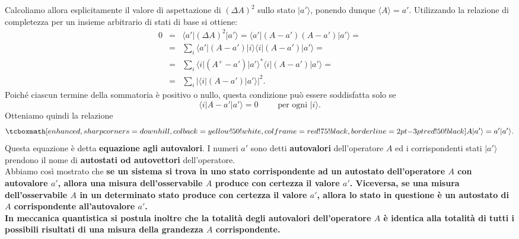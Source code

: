 Calcoliamo allora esplicitamente il valore di aspettazione di $(\Delta A )^2$ sullo stato $\vert a' \rangle$, ponendo dunque $\langle A \rangle = a'$. Utilizzando la relazione di completezza per un insieme arbitrario di stati di base si ottiene:
	\begin{eqnarray}
		0 & = & \langle a' \vert (\Delta A )^2 \vert a'\rangle = \langle a' \vert (A-a' )(A-a') \vert a'\rangle= \nonumber \\
		& = & \sum _i \langle a' \vert (A-a' ) \vert i \rangle \langle i \vert (A-a' ) \vert a' \rangle = \nonumber \\
		& = & \sum _i \langle i \vert (A^{+}-a' ) \vert a' \rangle ^* \langle i \vert (A-a' ) \vert a' \rangle = \nonumber \\
		& = & \sum _i \vert \langle i \vert (A-a' ) \vert a' \rangle \vert ^2.
	\end{eqnarray}
Poiché ciascun termine della sommatoria è positivo o nullo, questa condizione può essere soddisfatta solo se
	\begin{equation}
		\langle i \vert A-a' \vert a' \rangle =0 \qquad \textrm{ per ogni } \vert i \rangle .
	\end{equation}
Otteniamo quindi la relazione
	\begin{equation}
		\tcboxmath[enhanced,sharp corners=downhill ,colback=yellow!50!white,colframe=red!75!black, borderline={2pt}{-3pt}{red!50!black}]{
			A \vert a' \rangle =a' \vert a' \rangle .
			}
	\end{equation}
Questa equazione è detta \textbf{equazione agli autovalori}. I numeri $a'$ sono detti \textbf{autovalori} dell'operatore $A$ ed i corrispondenti stati $\vert a' \rangle $ prendono il nome di \textbf{autostati od autovettori} dell'operatore.\\

Abbiamo così mostrato che \textbf{se un sistema si trova in uno stato corrispondente ad un autostato dell'operatore $A$ con autovalore $a'$, allora una misura dell'osservabile $A$ produce con certezza il valore $a'$. Viceversa, se una misura dell'osservabile $A$ in un determinato stato produce con certezza il valore $a'$, allora lo stato in questione è un autostato di $A$ corrispondente all'autovalore $a'$.}\\

\textbf{In meccanica quantistica si postula inoltre che la totalità degli autovalori dell'operatore $A$ è identica alla totalità di tutti i possibili risultati di una misura della grandezza $A$ corrispondente.}\\

